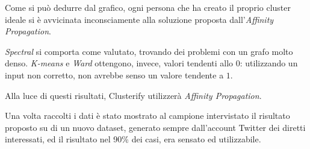 Come si può dedurre dal grafico, ogni persona che ha creato il proprio cluster ideale si è avvicinata inconsciamente alla soluzione proposta dall'\emph{Affinity Propagation}.

\emph{Spectral} si comporta come valutato, trovando dei problemi con un grafo molto denso. \emph{K-means} e \emph{Ward} ottengono, invece, valori tendenti allo $0$: utilizzando un input non corretto, non avrebbe senso un valore tendente a $1$.

Alla luce di questi risultati, Clusterify utilizzerà  \emph{Affinity Propagation}.

Una volta raccolti i dati è stato mostrato al campione intervistato il risultato proposto su di un nuovo dataset, generato sempre dall'account Twitter dei diretti interessati, ed il risultato nel 90\% dei casi, era sensato ed utilizzabile.
